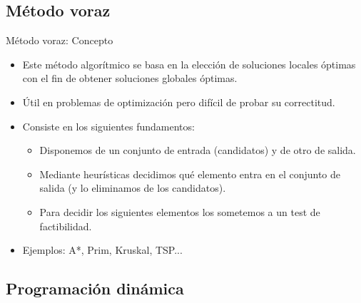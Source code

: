 \documentclass[10pt]{beamer}
\begin{document}
\subsection{Método voraz}
\begin{frame}{Método voraz: Concepto}
  \begin{itemize}
  \item Este método algorítmico se basa en la elección de soluciones locales óptimas
    con el fin de obtener soluciones globales óptimas. \pause
  \item Útil en problemas de optimización pero difícil de probar su correctitud. \pause
  \item Consiste en los siguientes fundamentos: \pause
    \begin{itemize}
    \item Disponemos de un conjunto de entrada (candidatos) y de otro de salida. \pause
    \item Mediante heurísticas decidimos qué elemento entra en el conjunto de salida
      (y lo eliminamos de los candidatos). \pause
    \item Para decidir los siguientes elementos los sometemos a un test de factibilidad. \pause
    \end{itemize}
  \item Ejemplos: A*, Prim, Kruskal, TSP...
  \end{itemize}
\end{frame}
\subsection{Programación dinámica}
\end{document}
